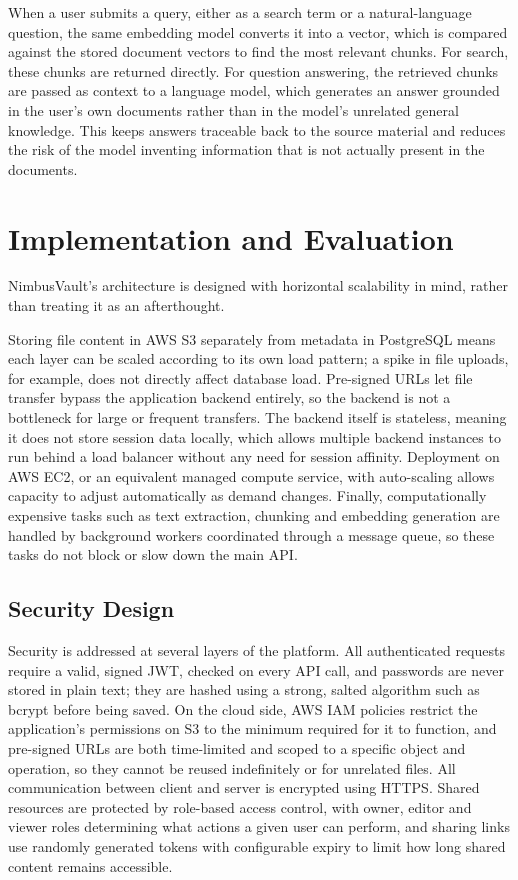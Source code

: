 \documentclass[11pt,a4paper,oneside]{report}
\begin{document}
When a user submits a query, either as a search term or a natural-language question, the same embedding model converts it into a vector, which is compared against the stored document vectors to find the most relevant chunks. For search, these chunks are returned directly. For question answering, the retrieved chunks are passed as context to a language model, which generates an answer grounded in the user's own documents rather than in the model's unrelated general knowledge. This keeps answers traceable back to the source material and reduces the risk of the model inventing information that is not actually present in the documents.

\chapter{Implementation and Evaluation}

NimbusVault's architecture is designed with horizontal scalability in mind, rather than treating it as an afterthought.

Storing file content in AWS S3 separately from metadata in PostgreSQL means each layer can be scaled according to its own load pattern; a spike in file uploads, for example, does not directly affect database load. Pre-signed URLs let file transfer bypass the application backend entirely, so the backend is not a bottleneck for large or frequent transfers. The backend itself is stateless, meaning it does not store session data locally, which allows multiple backend instances to run behind a load balancer without any need for session affinity. Deployment on AWS EC2, or an equivalent managed compute service, with auto-scaling allows capacity to adjust automatically as demand changes. Finally, computationally expensive tasks such as text extraction, chunking and embedding generation are handled by background workers coordinated through a message queue, so these tasks do not block or slow down the main API.

\section{Security Design}

Security is addressed at several layers of the platform. All authenticated requests require a valid, signed JWT, checked on every API call, and passwords are never stored in plain text; they are hashed using a strong, salted algorithm such as bcrypt before being saved. On the cloud side, AWS IAM policies restrict the application's permissions on S3 to the minimum required for it to function, and pre-signed URLs are both time-limited and scoped to a specific object and operation, so they cannot be reused indefinitely or for unrelated files. All communication between client and server is encrypted using HTTPS. Shared resources are protected by role-based access control, with owner, editor and viewer roles determining what actions a given user can perform, and sharing links use randomly generated tokens with configurable expiry to limit how long shared content remains accessible.
\end{document}
